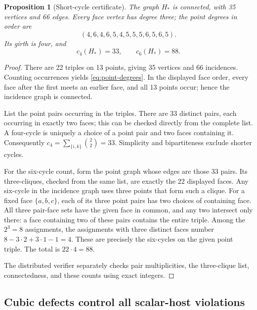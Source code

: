 \documentclass[11pt]{article}
\numberwithin{equation}{section}
\newtheorem{proposition}[theorem]{Proposition}
\theoremstyle{definition}
\theoremstyle{remark}
\newcommand{\Hstar}{H_{\!*}}
\begin{document}
\begin{proposition}[Short-cycle certificate]
\label{prop:incidence-data}
The graph $\Hstar$ is connected, with 35 vertices and 66 edges. Every
face vertex has degree three; the point degrees in order are
\begin{equation}
 (4,6,4,6,5,4,5,5,5,6,5,6,5).
 \label{eq:point-degrees}
\end{equation}
Its girth is four, and
\begin{equation}
 c_4(\Hstar)=33,\qquad c_6(\Hstar)=88.
 \label{eq:incidence-cycles}
\end{equation}
\end{proposition}
\begin{proof}
There are 22 triples on 13 points, giving 35 vertices and 66 incidences.
Counting occurrences yields \eqref{eq:point-degrees}. In the displayed
face order, every face after the first meets an earlier face, and all
13 points occur; hence the incidence graph is connected.

List the point pairs occurring in the triples. There are 33 distinct
pairs, each occurring in exactly two faces; this can be checked directly
from the complete list. A four-cycle is uniquely a choice of a point
pair and two faces containing it. Consequently
$c_4=\sum_{\{i,k\}}\binom{2}{2}=33$. Simplicity and bipartiteness
exclude shorter cycles.

For the six-cycle count, form the point graph whose edges are those 33
pairs. Its three-cliques, checked from the same list, are exactly the
22 displayed faces. Any six-cycle in the incidence graph uses three
points that form such a clique. For a fixed face $\{a,b,c\}$, each of
its three point pairs has two choices of containing face. All three
pair-face sets have the given face in common, and any two intersect
only there: a face containing two of these pairs contains the entire
triple. Among the $2^3=8$ assignments, the assignments with three
distinct faces number
$8-3\cdot2+3\cdot1-1=4$. These are precisely the six-cycles on the
given point triple. The total is $22\cdot4=88$.

The distributed verifier separately checks pair multiplicities, the
three-clique list, connectedness, and these counts using exact integers.
\end{proof}

\subsection{Cubic defects control all scalar-host violations}
\end{document}
